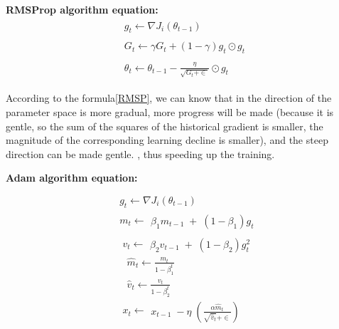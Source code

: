 \documentclass{article}
\begin{document}
\textbf{RMSProp algorithm equation:}
\begin{equation}\label{RMSP}
\begin{aligned}
\begin{array}{l}g_t\leftarrow\nabla J_i\left(\theta_{t-1}\right)\end{array}\\
\begin{array}{l}G_t\leftarrow\gamma G_t+\left(1-\gamma\right)g_t\odot g_t\end{array}\\
\begin{array}{l}\theta_t\leftarrow\theta_{t-1}-\frac\eta{\sqrt{G_t+\in}}\odot g_t\end{array}
\end{aligned}
\end{equation}

According to the formula\ref{RMSP}, we can know that in the direction of the parameter space is more gradual, more progress will be made (because it is gentle, so the sum of the squares of the historical gradient is smaller, the magnitude of the corresponding learning decline is smaller), and the steep direction can be made gentle. , thus speeding up the training.

\textbf{Adam algorithm equation:}
\begin{equation}\label{adam}
\begin{aligned}
\begin{array}{l}\begin{array}{l}\begin{array}{l}\begin{array}{l}g_t\leftarrow\nabla J_i\left(\theta_{t-1}\right)\end{array}\\\begin{array}{l}m_t\leftarrow\end{array}\beta_1m_{t-1}\;+\;\left(1-\beta_1\right)g_t\end{array}\end{array}\\\begin{array}{l}\;\;\;\;v_t\leftarrow\end{array}\beta_2v_{t-1}\;+\;\left(1-\beta_2\right)g_t^2\\\;\;\;\;\;\;\;{\widehat m}_t\leftarrow\frac{m_t}{1-\beta_1^t}\\\;\;\;\;\;\;\;{\widehat v}_t\leftarrow\frac{v_t}{1-\beta_2^t}\\\;\;\;\;\begin{array}{l}x_t\leftarrow\end{array}x_{t-1}\;-\eta\;\left(\frac{\alpha{\widehat m}_t}{\sqrt{{\widehat v}_t}+\in}\right)\end{array}
\end{aligned}
\end{equation}
\end{document}
